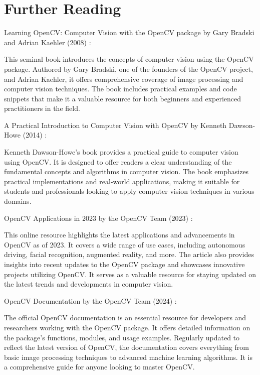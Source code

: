 \section{Further Reading}
Learning OpenCV: Computer Vision with the OpenCV package by Gary Bradski and Adrian Kaehler (2008) \cite{Bradski:2008}:

This seminal book introduces the concepts of computer vision using the OpenCV package. Authored by Gary Bradski, one of the founders of the OpenCV project, and Adrian Kaehler, it offers comprehensive coverage of image processing and computer vision techniques. The book includes practical examples and code snippets that make it a valuable resource for both beginners and experienced practitioners in the field. 

A Practical Introduction to Computer Vision with OpenCV by Kenneth Dawson-Howe (2014) \cite{Dawson:2014}: 

Kenneth Dawson-Howe's book provides a practical guide to computer vision using OpenCV. It is designed to offer readers a clear understanding of the fundamental concepts and algorithms in computer vision. The book emphasizes practical implementations and real-world applications, making it suitable for students and professionals looking to apply computer vision techniques in various domains. 

OpenCV Applications in 2023 by the OpenCV Team (2023) \cite{OpenCVTeam:2023}:

This online resource highlights the latest applications and advancements in OpenCV as of 2023. It covers a wide range of use cases, including autonomous driving, facial recognition, augmented reality, and more. The article also provides insights into recent updates to the OpenCV package and showcases innovative projects utilizing OpenCV. It serves as a valuable resource for staying updated on the latest trends and developments in computer vision. 

OpenCV Documentation by the OpenCV Team (2024) \cite{OpenCVTeam:2024}:

The official OpenCV documentation is an essential resource for developers and researchers working with the OpenCV package. It offers detailed information on the package's functions, modules, and usage examples. Regularly updated to reflect the latest version of OpenCV, the documentation covers everything from basic image processing techniques to advanced machine learning algorithms. It is a comprehensive guide for anyone looking to master OpenCV. 
